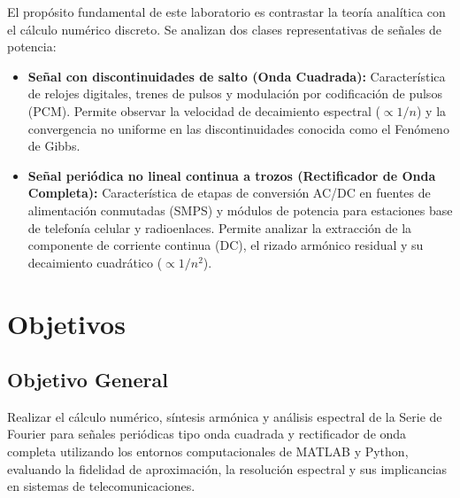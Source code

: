 \documentclass[11pt,a4paper]{article}
\begin{document}
El propósito fundamental de este laboratorio es contrastar la teoría analítica con el cálculo numérico discreto. Se analizan dos clases representativas de señales de potencia:
\begin{itemize}[leftmargin=*]
    \item \textbf{Señal con discontinuidades de salto (Onda Cuadrada):} Característica de relojes digitales, trenes de pulsos y modulación por codificación de pulsos (PCM). Permite observar la velocidad de decaimiento espectral ($\propto 1/n$) y la convergencia no uniforme en las discontinuidades conocida como el Fenómeno de Gibbs.
    \item \textbf{Señal periódica no lineal continua a trozos (Rectificador de Onda Completa):} Característica de etapas de conversión AC/DC en fuentes de alimentación conmutadas (SMPS) y módulos de potencia para estaciones base de telefonía celular y radioenlaces. Permite analizar la extracción de la componente de corriente continua (DC), el rizado armónico residual y su decaimiento cuadrático ($\propto 1/n^2$).
\end{itemize}

\section{Objetivos}

\subsection{Objetivo General}
Realizar el cálculo numérico, síntesis armónica y análisis espectral de la Serie de Fourier para señales periódicas tipo onda cuadrada y rectificador de onda completa utilizando los entornos computacionales de MATLAB y Python, evaluando la fidelidad de aproximación, la resolución espectral y sus implicancias en sistemas de telecomunicaciones.
\end{document}
